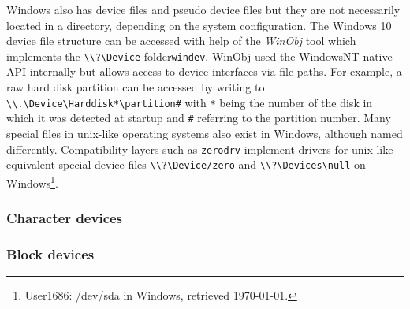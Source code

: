 Windows also has device files and pseudo device files but they are not necessarily located in a directory, depending
on the system configuration. The Windows 10 device file structure can be accessed with help of the \textit{WinObj} tool which
implements the \texttt{\textbackslash \textbackslash ?\textbackslash Device} folder\texttt{windev}. WinObj used the WindowsNT native API internally but allows access to device interfaces
via file paths. For example, a raw hard disk partition can be accessed by writing to \texttt{\textbackslash \textbackslash .\textbackslash Device\textbackslash Harddisk*\textbackslash partition\#}
with \texttt{*} being the number of the disk in which it was detected at startup and \texttt{\#} referring to the partition number.
Many special files in unix-like operating systems also exist in Windows, although named differently. Compatibility layers
such as \texttt{zerodrv} implement drivers for unix-like equivalent special device files \texttt{\textbackslash \textbackslash ?\textbackslash Device/zero} and \texttt{\textbackslash \textbackslash ?\textbackslash Devices\textbackslash null}
on Windows\footnote{ User1686: /dev/sda in Windows, retrieved \today.}.


\subsubsection{Character devices}
\subsubsection{Block devices}
